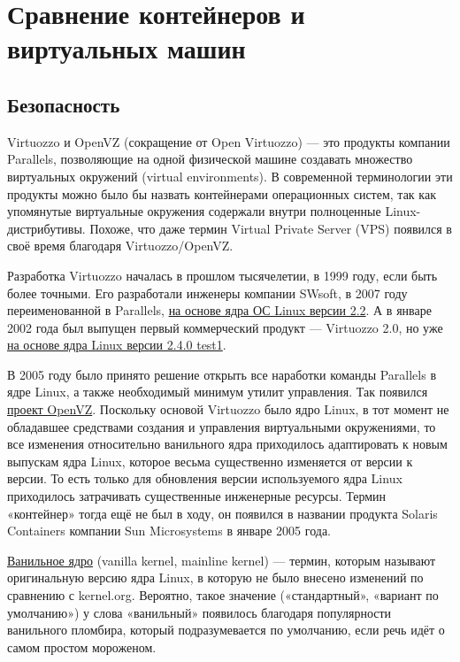 \documentclass[14pt, a4paper]{article}
\begin{document}
\section*{Сравнение контейнеров и виртуальных машин}

\subsection*{Безопасность}

Virtuozzo и OpenVZ (сокращение от Open Virtuozzo) — это продукты компании Parallels, позволяющие
на одной физической машине создавать множество виртуальных окружений (virtual environments). В
современной терминологии эти продукты можно было бы назвать контейнерами операционных
систем, так как упомянутые виртуальные окружения содержали внутри полноценные
Linux-дистрибутивы. Похоже, что даже термин Virtual Private Server (VPS) появился в своё время
благодаря Virtuozzo/OpenVZ.

Разработка Virtuozzo началась в прошлом тысячелетии, в 1999 году, если быть более точными. Его
разработали инженеры компании SWsoft, в 2007 году переименованной в Parallels, \href{https://openvz.livejournal.com/49158.html}{на основе ядра ОС
Linux версии 2.2}. А в январе 2002 года был выпущен первый коммерческий продукт — Virtuozzo 2.0, но
уже \href{https://cdn.kernel.org/pub/linux/kernel/v2.4/old-test-kernels/linux-2.4.0-test1.tar.gz}{на основе ядра Linux версии 2.4.0 test1}.

В 2005 году было принято решение открыть все наработки команды Parallels в ядре Linux, а также
необходимый минимум утилит управления. Так появился \href{https://www.linux.com/news/swsoft-offers-free-open-source-version-virtuozzo/}{проект OpenVZ}. Поскольку основой Virtuozzo
было ядро Linux, в тот момент не обладавшее средствами создания и управления виртуальными
окружениями, то все изменения относительно ванильного ядра приходилось адаптировать к новым
выпускам ядра Linux, которое весьма существенно изменяется от версии к версии. То есть только для
обновления версии используемого ядра Linux приходилось затрачивать существенные инженерные
ресурсы. Термин «контейнер» тогда ещё не был в ходу, он появился в названии продукта Solaris
Containers компании Sun Microsystems в январе 2005 года.

\href{https://ru.wikipedia.org/wiki/Âàíèëüíîå_ÿäðî}{Ванильное ядро} (vanilla kernel, mainline kernel) — термин, которым называют оригинальную версию
ядра Linux, в которую не было внесено изменений по сравнению с kernel.org. Вероятно, такое
значение («стандартный», «вариант по умолчанию») у слова «ванильный» появилось благодаря
популярности ванильного пломбира, который подразумевается по умолчанию, если речь идёт о самом
простом мороженом.
\end{document}
